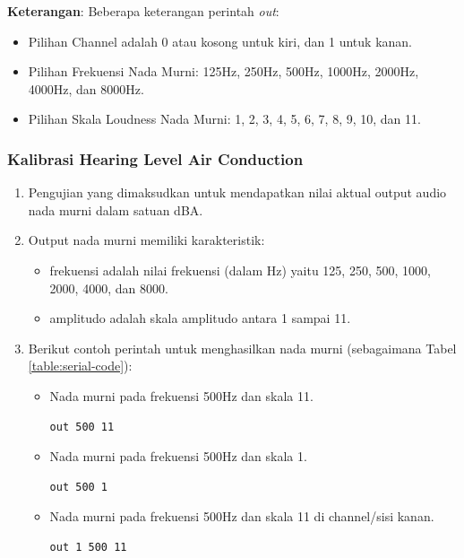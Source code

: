 \documentclass{article}
\begin{document}
	\textbf{Keterangan}: Beberapa keterangan perintah \textit{out}:
	\begin{itemize}
		\item Pilihan Channel adalah 0 atau kosong untuk kiri, dan 1 untuk kanan.
		\item Pilihan Frekuensi Nada Murni: 125Hz, 250Hz, 500Hz, 1000Hz, 2000Hz, 4000Hz, dan 8000Hz.
		\item Pilihan Skala Loudness Nada Murni: 1, 2, 3, 4, 5, 6, 7, 8, 9, 10, dan 11.
	\end{itemize}
	
	\subsubsection{Kalibrasi Hearing Level Air Conduction}
	\label{subsubsec:hl}
	\begin{enumerate}
		\item Pengujian yang dimaksudkan untuk mendapatkan nilai aktual output audio nada murni dalam satuan dBA.
		
		\item Output nada murni memiliki karakteristik:
		\begin{itemize}
			\item frekuensi adalah nilai frekuensi (dalam Hz) yaitu 125, 250, 500, 1000, 2000, 4000, dan 8000.
			\item amplitudo adalah skala amplitudo antara 1 sampai 11.
		\end{itemize}
		
		\item Berikut contoh perintah untuk menghasilkan nada murni (sebagaimana Tabel \ref{table:serial-code}):
		
		\begin{itemize}
			\item Nada murni pada frekuensi 500Hz dan skala 11.
			\begin{verbatim}
out 500 11
			\end{verbatim}
			
			\item Nada murni pada frekuensi 500Hz dan skala 1.
			\begin{verbatim}
out 500 1
			\end{verbatim}
			
			\item Nada murni pada frekuensi 500Hz dan skala 11 di channel/sisi kanan.
			\begin{verbatim}
out 1 500 11
			\end{verbatim}
			

\end{itemize}
\end{enumerate}
\end{document}
